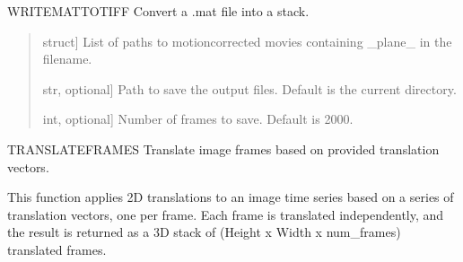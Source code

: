 \documentclass[letterpaper,10pt,english]{sphinxmanual}
\begin{document}
\begin{fulllineitems}
\label{\detokenize{api/utils:writeMatToTiffStack}}
\pysigstartsignatures
{}
\pysigstopsignatures
\sphinxAtStartPar
WRITEMATTOTIFF Convert a .mat file into a stack.
\begin{quote}\begin{description}
\begin{description}
\sphinxlineitem{\sphinxstylestrong{files}}{[}struct{]}
\sphinxAtStartPar
List of paths to motion\sphinxhyphen{}corrected movies containing \_plane\_ in the filename.

\sphinxlineitem{\sphinxstylestrong{savePath}}{[}str, optional{]}
\sphinxAtStartPar
Path to save the output files. Default is the current directory.

\sphinxlineitem{\sphinxstylestrong{numFrames}}{[}int, optional{]}
\sphinxAtStartPar
Number of frames to save. Default is 2000.

\end{description}

\end{description}\end{quote}

\end{fulllineitems}


\begin{fulllineitems}
\label{\detokenize{api/utils:translateFrames}}
\pysigstartsignatures
{}
\pysigstopsignatures
\sphinxAtStartPar
TRANSLATEFRAMES Translate image frames based on provided translation vectors.

\sphinxAtStartPar
This function applies 2D translations to an image time series based on
a series of translation vectors, one per frame. Each frame is translated
independently, and the result is returned as a 3D stack of
(Height x Width x num\_frames) translated frames.

\end{fulllineitems}
\end{document}
